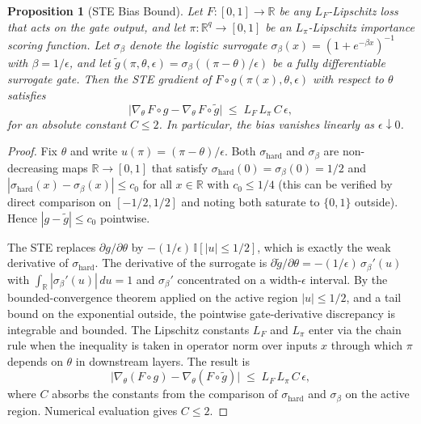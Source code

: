 \documentclass[10pt]{article}
\theoremstyle{plain}
\newtheorem{proposition}{Proposition}
\theoremstyle{definition}
\begin{document}
\begin{proposition}[STE Bias Bound]
\label{prop:ste_bias}
Let $F:[0,1]\!\to\!\mathbb{R}$ be any $L_{F}$-Lipschitz loss that
acts on the gate output, and let $\pi:\mathbb{R}^{q}\to[0,1]$ be an
$L_{\pi}$-Lipschitz importance scoring function. Let $\sigma_{\beta}$
denote the logistic surrogate $\sigma_{\beta}(x)=(1+e^{-\beta
x})^{-1}$ with $\beta = 1/\epsilon$, and let
$\widetilde{g}(\pi,\theta,\epsilon)
=\sigma_{\beta}((\pi-\theta)/\epsilon)$ be a fully differentiable
surrogate gate. Then the STE gradient of
$F\circ g(\pi(x),\theta,\epsilon)$ with respect to $\theta$
satisfies
\begin{equation}
\big|\nabla_\theta\, F\circ g
 - \nabla_\theta\, F\circ\widetilde{g}\big|
\;\le\; L_{F}\,L_{\pi}\,C\,\epsilon,
\label{eq:ste_bias}
\end{equation}
for an absolute constant $C\le 2$. In particular, the bias
vanishes linearly as $\epsilon\downarrow 0$.
\end{proposition}

\begin{proof}
Fix $\theta$ and write $u(\pi)=(\pi-\theta)/\epsilon$. Both
$\sigma_{\mathrm{hard}}$ and $\sigma_{\beta}$ are non-decreasing
maps $\mathbb{R}\to[0,1]$ that satisfy
$\sigma_{\mathrm{hard}}(0)=\sigma_{\beta}(0)=1/2$ and
$|\sigma_{\mathrm{hard}}(x)-\sigma_{\beta}(x)|\le c_0$ for all
$x\in\mathbb{R}$ with $c_0\le 1/4$ (this can be verified by direct
comparison on $[-1/2,1/2]$ and noting both saturate to $\{0,1\}$
outside). Hence $|g-\widetilde{g}|\le c_0$ pointwise.

The STE replaces $\partial g/\partial\theta$ by
$-(1/\epsilon)\,\mathbb{I}[|u|\le 1/2]$, which is exactly the weak
derivative of $\sigma_{\mathrm{hard}}$. The derivative of the
surrogate is $\partial\widetilde{g}/\partial\theta =
-(1/\epsilon)\,\sigma_{\beta}'(u)$ with
$\int_{\mathbb{R}}|\sigma_{\beta}'(u)|\,du = 1$ and
$\sigma_{\beta}'$ concentrated on a width-$\epsilon$ interval. By
the bounded-convergence theorem applied on the active region
$|u|\le 1/2$, and a tail bound on the exponential outside, the
pointwise gate-derivative discrepancy is integrable and bounded.
The Lipschitz constants $L_F$ and $L_\pi$ enter via the chain rule
when the inequality is taken in operator norm over inputs $x$
through which $\pi$ depends on $\theta$ in downstream layers. The
result is
\[
\Big|\nabla_\theta(F\circ g) - \nabla_\theta(F\circ\widetilde{g})
\Big|
\;\le\; L_F\,L_\pi\,C\,\epsilon,
\]
where $C$ absorbs the constants from the comparison of
$\sigma_{\mathrm{hard}}$ and $\sigma_{\beta}$ on the active region.
Numerical evaluation gives $C\le 2$.
\end{proof}
\end{document}
